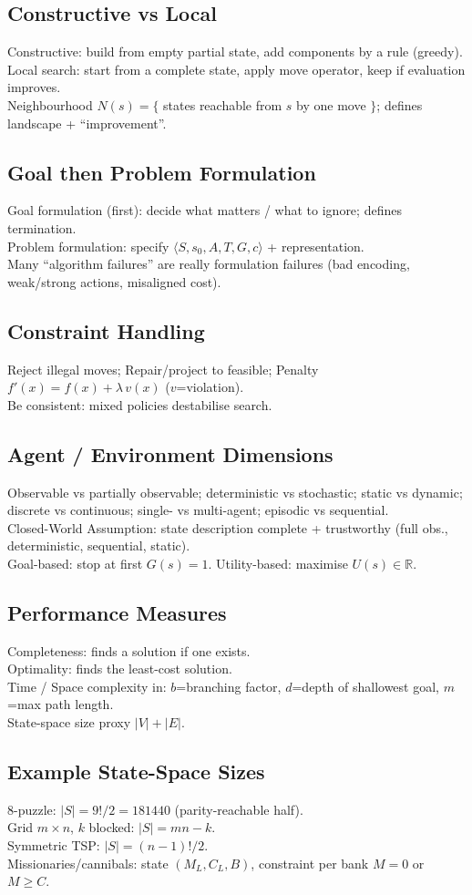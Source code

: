 \subsection*{Constructive vs Local}
Constructive: build from empty partial state, add components by a rule (greedy).\\
Local search: start from a complete state, apply move operator, keep if evaluation improves.\\
Neighbourhood \( N(s)=\{ \) states reachable from \(s\) by one move \(\} \); defines landscape + ``improvement''.

\subsection*{Goal then Problem Formulation}
Goal formulation (first): decide what matters / what to ignore; defines termination.\\
Problem formulation: specify \( \langle S,s_0,A,T,G,c\rangle \) + representation.\\
Many ``algorithm failures'' are really formulation failures (bad encoding, weak/strong actions, misaligned cost).

\subsection*{Constraint Handling}
Reject illegal moves; Repair/project to feasible; Penalty \( f'(x)=f(x)+\lambda\,v(x) \) (\(v\)=violation).\\
Be consistent: mixed policies destabilise search.

\subsection*{Agent / Environment Dimensions}
Observable vs partially observable; deterministic vs stochastic; static vs dynamic; discrete vs continuous; single- vs multi-agent; episodic vs sequential.\\
Closed-World Assumption: state description complete + trustworthy (full obs., deterministic, sequential, static).\\
Goal-based: stop at first \(G(s)=1\). Utility-based: maximise \( U(s)\in\mathbb{R} \).

\subsection*{Performance Measures}
Completeness: finds a solution if one exists.\\
Optimality: finds the least-cost solution.\\
Time / Space complexity in: \(b\)=branching factor, \(d\)=depth of shallowest goal, \(m\)=max path length.\\
State-space size proxy \( |V|+|E| \).

\subsection*{Example State-Space Sizes}
8-puzzle: \( |S|=9!/2=181440 \) (parity-reachable half).\\
Grid \(m\times n\), \(k\) blocked: \( |S|=mn-k \).\\
Symmetric TSP: \( |S|=(n-1)!/2 \).\\
Missionaries/cannibals: state \((M_L,C_L,B)\), constraint per bank \(M{=}0\) or \(M\ge C\).
